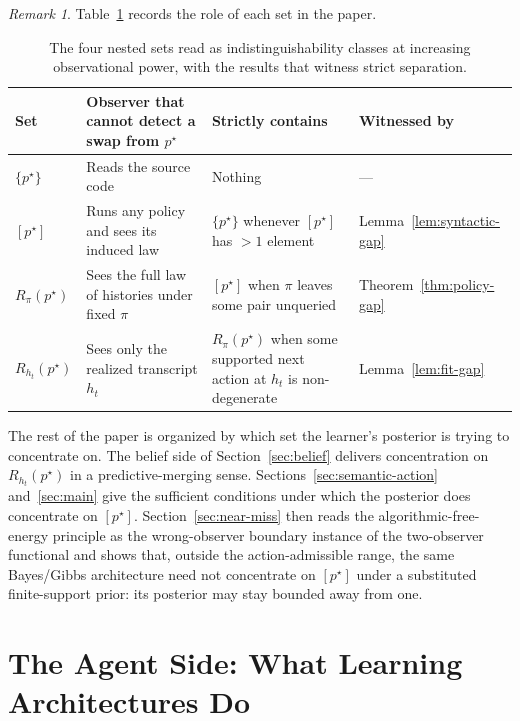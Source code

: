 \documentclass[11pt]{article}
\theoremstyle{definition}
\theoremstyle{remark}
\newtheorem{remark}[theorem]{Remark}
\begin{document}
\begin{remark}
Table~\ref{tab:hierarchy} records the role of each set in the paper.
\end{remark}

\begin{table}[ht]
\centering
\small
\caption{The four nested sets read as indistinguishability classes at increasing observational power, with the results that witness strict separation.}
\label{tab:hierarchy}
\begin{tabularx}{\textwidth}{@{}>{\raggedright\arraybackslash}p{}>{\raggedright\arraybackslash}p{}>{\raggedright\arraybackslash}X>{\raggedright\arraybackslash}p{}@{}}
\toprule
\textbf{Set} & \textbf{Observer that cannot detect a swap from $p^\star$} & \textbf{Strictly contains} & \textbf{Witnessed by} \\
\midrule
$\{p^\star\}$ & Reads the source code & Nothing & --- \\
$[p^\star]$ & Runs any policy and sees its induced law & $\{p^\star\}$ whenever $[p^\star]$ has $>1$ element & Lemma~\ref{lem:syntactic-gap} \\
$R_\pi(p^\star)$ & Sees the full law of histories under fixed $\pi$ & $[p^\star]$ when $\pi$ leaves some pair unqueried & Theorem~\ref{thm:policy-gap} \\
$R_{h_t}(p^\star)$ & Sees only the realized transcript $h_t$ & $R_\pi(p^\star)$ when some supported next action at $h_t$ is non-degenerate & Lemma~\ref{lem:fit-gap} \\
\bottomrule
\end{tabularx}
\end{table}

The rest of the paper is organized by which set the learner's posterior is trying to concentrate on. The belief side of Section~\ref{sec:belief} delivers concentration on $R_{h_t}(p^\star)$ in a predictive-merging sense. Sections~\ref{sec:semantic-action} and~\ref{sec:main} give the sufficient conditions under which the posterior does concentrate on $[p^\star]$. Section~\ref{sec:near-miss} then reads the algorithmic-free-energy principle as the wrong-observer boundary instance of the two-observer functional and shows that, outside the action-admissible range, the same Bayes/Gibbs architecture need not concentrate on $[p^\star]$ under a substituted finite-support prior: its posterior may stay bounded away from one.

\part{The Agent Side: What Learning Architectures Do}
\label{part:agent}
\end{document}
